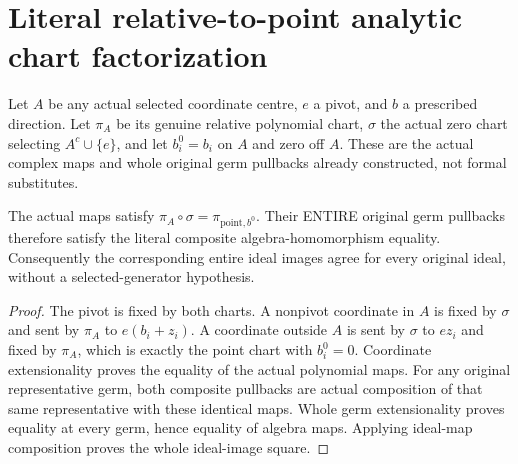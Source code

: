 \section{Literal relative-to-point analytic chart factorization}

Let $A$ be any actual selected coordinate centre, $e$ a pivot, and $b$ a
prescribed direction. Let $\pi_A$ be its genuine relative polynomial chart,
$\sigma$ the actual zero chart selecting $A^c\cup\{e\}$, and let $b^0_i=b_i$
on $A$ and zero off $A$. These are the actual complex maps and whole original
germ pullbacks already constructed, not formal substitutes.

\begin{theorem}
\label{hir:actual-relative-point-chart-factorization}
\leanok
The actual maps satisfy $\pi_A\circ\sigma=\pi_{\mathrm{point},b^0}$.
Their ENTIRE original germ pullbacks therefore satisfy the literal composite
algebra-homomorphism equality. Consequently the corresponding entire ideal
images agree for every original ideal, without a selected-generator hypothesis.
\end{theorem}
\begin{proof}
The pivot is fixed by both charts. A nonpivot coordinate in $A$ is fixed by
$\sigma$ and sent by $\pi_A$ to $e(b_i+z_i)$. A coordinate outside $A$ is
sent by $\sigma$ to $ez_i$ and fixed by $\pi_A$, which is exactly the point
chart with $b^0_i=0$. Coordinate extensionality proves the equality of the
actual polynomial maps. For any original representative germ, both composite
pullbacks are actual composition of that same representative with these
identical maps. Whole germ extensionality proves equality at every germ,
hence equality of algebra maps. Applying ideal-map composition proves the
whole ideal-image square.
\end{proof}

